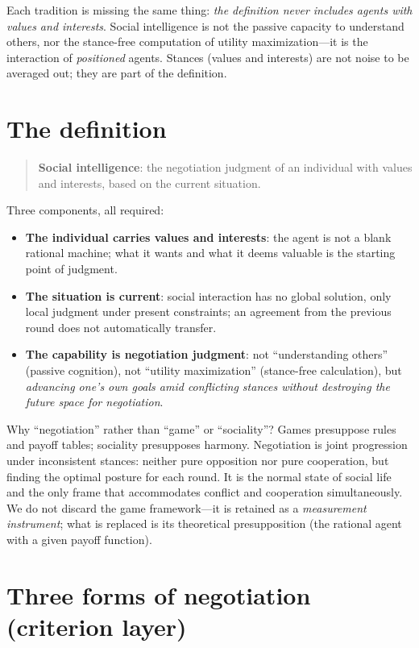 \documentclass[11pt]{article}
\begin{document}
Each tradition is missing the same thing: \emph{the definition never includes agents with values and interests}. Social intelligence is not the passive capacity to understand others, nor the stance-free computation of utility maximization---it is the interaction of \emph{positioned} agents. Stances (values and interests) are not noise to be averaged out; they are part of the definition.

\section{The definition}
\label{sec:definition}

\begin{quote}
\textbf{Social intelligence}: the negotiation judgment of an individual with values and interests, based on the current situation.
\end{quote}

Three components, all required:

\begin{itemize}
\item \textbf{The individual carries values and interests}: the agent is not a blank rational machine; what it wants and what it deems valuable is the starting point of judgment.
\item \textbf{The situation is current}: social interaction has no global solution, only local judgment under present constraints; an agreement from the previous round does not automatically transfer.
\item \textbf{The capability is negotiation judgment}: not ``understanding others'' (passive cognition), not ``utility maximization'' (stance-free calculation), but \emph{advancing one's own goals amid conflicting stances without destroying the future space for negotiation}.
\end{itemize}

Why ``negotiation'' rather than ``game'' or ``sociality''? Games presuppose rules and payoff tables; sociality presupposes harmony. Negotiation is joint progression under inconsistent stances: neither pure opposition nor pure cooperation, but finding the optimal posture for each round. It is the normal state of social life and the only frame that accommodates conflict and cooperation simultaneously. We do not discard the game framework---it is retained as a \emph{measurement instrument}; what is replaced is its theoretical presupposition (the rational agent with a given payoff function).

\section{Three forms of negotiation (criterion layer)}
\label{sec:forms}
\end{document}
